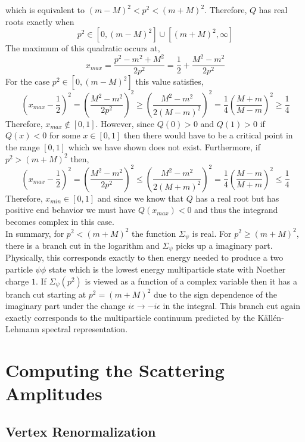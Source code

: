 \documentclass{article}
\begin{document}
which is equivalent to $(m - M)^2 < p^2 < (m + M)^2$. Therefore, $Q$ has real roots exactly when\[p^2 \in [0, (m - M)^2] \cup [(m+M)^2, \infty]\]
The maximum of this quadratic occurs at,
\[x_{max} = \frac{p^2 - m^2 + M^2}{2 p^2}  = \frac{1}{2} + \frac{M^2 - m^2}{2 p^2}\]
For the case $p^2 \in [0, (m - M)^2]$ this value satisfies,
\[ \left(x_{max} - \frac{1}{2} \right)^2 = \left( \frac{M^2 - m^2}{2 p^2} \right)^2 \ge \left( \frac{M^2 - m^2}{2 (M - m)^2} \right)^2 = \frac{1}{4} \left( \frac{M + m}{M - m} \right)^2  \ge \frac{1}{4}\]
Therefore, $x_{max} \notin [0, 1]$. However, since $Q(0) > 0$ and $Q(1) > 0$ if $Q(x) < 0$ for some $x \in [0, 1]$ then there would have to be a critical point in the range $[0, 1]$ which we have shown does not exist. Furthermore, if $p^2 > (m + M)^2$ then, 
\[ \left(x_{max} - \frac{1}{2} \right)^2 = \left( \frac{M^2 - m^2}{2 p^2} \right)^2 \le \left( \frac{M^2 - m^2}{2 (M + m)^2} \right)^2 = \frac{1}{4} \left( \frac{M - m}{M + m} \right)^2  \le \frac{1}{4}\]
Therefore, $x_{min} \in [0, 1]$ and since we know that $Q$ has a real root but has positive end behavior we must have $Q(x_{max}) < 0$ and thus the integrand becomes complex in this case. \bigskip\\
In summary, for $p^2 < (m + M)^2$ the function $\Sigma_{\psi}$ is real. For $p^2 \ge (m + M)^2$, there is a branch cut in the logarithm and $\Sigma_\psi$ picks up a imaginary part. Physically, this corresponds exactly to then energy needed to produce a two particle $\psi \phi$ state which is the lowest energy multiparticle state with Noether charge $1$. If $\Sigma_\psi(p^2)$ is viewed as a function of a complex variable then it has a branch cut starting at $p^2 = (m + M)^2$ due to the sign dependence of the imaginary part under the change $i \epsilon \to - i \epsilon$ in the integral. This branch cut again exactly corresponds to the multiparticle continuum predicted by the K{\"a}ll{\'e}n-Lehmann spectral representation.

\section{Computing the Scattering Amplitudes}
\subsection{Vertex Renormalization}
\end{document}

